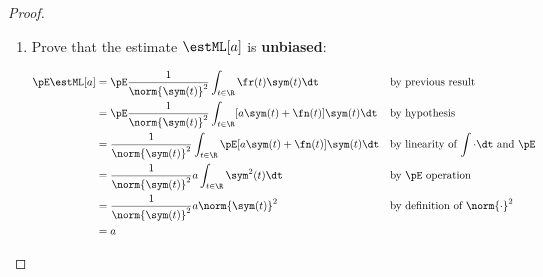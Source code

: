 \begin{proof}
\begin{enumerate}
\item Prove that the estimate $\estML[a]$ is {\bf unbiased}:

\begin{align*}
   \pE\estML[a]
     &= \pE\frac{1}{\norm{\sym(t)}^2} \int_{t\in\R} \fr(t)\sym(t) \dt
     && \text{by previous result}
   \\&= \pE\frac{1}{\norm{\sym(t)}^2} \int_{t\in\R} [ a \sym(t)+\fn(t)]\sym(t) \dt
     && \text{by hypothesis}
   \\&= \frac{1}{\norm{\sym(t)}^2} \int_{t\in\R} \pE[ a \sym(t)+\fn(t)]\sym(t) \dt
     && \text{by linearity of $\int\cdot\dt$ and $\pE$}
   \\&= \frac{1}{\norm{\sym(t)}^2}  a  \int_{t\in\R} \sym^2(t) \dt
     && \text{by $\pE$ operation}
   \\&= \frac{1}{\norm{\sym(t)}^2}  a  \norm{\sym(t)}^2
     && \text{by definition of $\norm{\cdot}^2$}
   \\&=   a
\end{align*}


\end{enumerate}
\end{proof}
